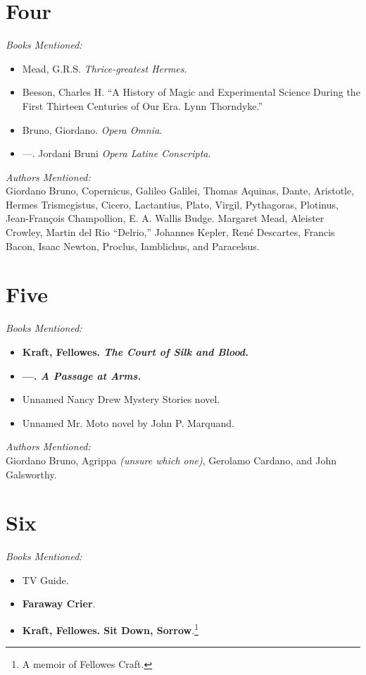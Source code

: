 \documentclass[12pt,makeidx]{extreport}
\begin{document}
\section{Four}
\textit{Books Mentioned:}
\begin{itemize}
\item Mead, G.R.S. \textit{Thrice-greatest Hermes}. \cite{Mead1906}
\item Beeson, Charles H. “A History of Magic and Experimental Science During the First Thirteen Centuries of Our Era. Lynn Thorndyke.” \cite{Beeson1925}
\item Bruno, Giordano. \textit{Opera Omnia}. \cite{Bruno1854}
\item —. Jordani Bruni \textit{Opera Latine Conscripta}. \cite{Bruno1962}
\end{itemize}
\textit{Authors Mentioned:}\\
Giordano Bruno, Copernicus, Galileo Galilei, Thomas Aquinas, Dante, Aristotle, Hermes Trismegistus, Cicero, Lactantius, Plato, Virgil, Pythagoras, Plotinus, Jean-François Champollion, E. A. Wallis Budge. Margaret Mead, Aleister Crowley, Martin del Rio ``Delrio,'' Johannes Kepler, René Descartes, Francis Bacon, Isaac Newton, Proclus, Iamblichus, and Paracelsus.

\section{Five}
\textit{Books Mentioned:}
\begin{itemize}
\item \textbf{Kraft, Fellowes. \textit{The Court of Silk and Blood.}} \cite{Kraftc}
\item \textbf{—. \textit{A Passage at Arms.}} \cite{Kraftd}
\item Unnamed Nancy Drew Mystery Stories novel.
\item Unnamed Mr. Moto novel by John P. Marquand.
\end{itemize}
\textit{Authors Mentioned:}\\
Giordano Bruno, Agrippa \textit{(unsure which one)}, Gerolamo Cardano, and John Galsworthy.

\section{Six}
\textit{Books Mentioned:}
\begin{itemize}
\item TV Guide.
\item \textbf{Faraway Crier}. \cite{faraway}
\item \textbf{Kraft, Fellowes. Sit Down, Sorrow}.\footnote{A memoir of Fellowes Craft.} \cite{Krafte}
\end{itemize}
\end{document}
